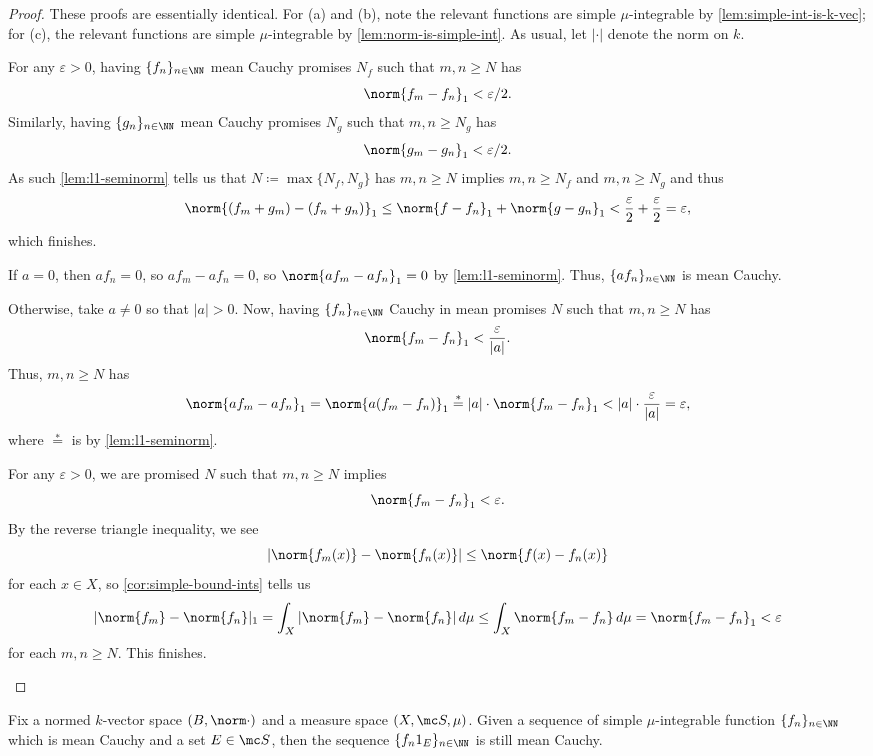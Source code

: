 \documentclass[../notes.tex]{subfiles}
\begin{document}
\begin{proof}
	These proofs are essentially identical. For (a) and (b), note the relevant functions are simple $\mu$-integrable by \autoref{lem:simple-int-is-k-vec}; for (c), the relevant functions are simple $\mu$-integrable by \autoref{lem:norm-is-simple-int}. As usual, let $|\cdot|$ denote the norm on $k$.
	\begin{listalph}
		\item For any $\varepsilon>0$, having $\{f_n\}_{n\in\NN}$ mean Cauchy promises $N_f$ such that $m,n\ge N$ has
		\[\norm{f_m-f_n}_1<\varepsilon/2.\]
		Similarly, having $\{g_n\}_{n\in\NN}$ mean Cauchy promises $N_g$ such that $m,n\ge N_g$ has
		\[\norm{g_m-g_n}_1<\varepsilon/2.\]
		As such \autoref{lem:l1-seminorm} tells us that $N\coloneqq\max\{N_f,N_g\}$ has $m,n\ge N$ implies $m,n\ge N_f$ and $m,n\ge N_g$ and thus
		\[\norm{(f_m+g_m)-(f_n+g_n)}_1\le\norm{f-f_n}_1+\norm{g-g_n}_1<\frac\varepsilon2+\frac\varepsilon2=\varepsilon,\]
		which finishes.
		\item If $a=0$, then $af_n=0$, so $af_m-af_n=0$, so $\norm{af_m-af_n}_1=0$ by \autoref{lem:l1-seminorm}. Thus, $\{af_n\}_{n\in\NN}$ is mean Cauchy.

		Otherwise, take $a\ne0$ so that $|a|>0$. Now, having $\{f_n\}_{n\in\NN}$ Cauchy in mean promises $N$ such that $m,n\ge N$ has
		\[\norm{f_m-f_n}_1<\frac\varepsilon{|a|}.\]
		Thus, $m,n\ge N$ has
		\[\norm{af_m-af_n}_1=\norm{a(f_m-f_n)}_1\stackrel*=|a|\cdot\norm{f_m-f_n}_1<|a|\cdot\frac\varepsilon{|a|}=\varepsilon,\]
		where $\stackrel*=$ is by \autoref{lem:l1-seminorm}.
		\item For any $\varepsilon>0$, we are promised $N$ such that $m,n\ge N$ implies
		\[\norm{f_m-f_n}_1<\varepsilon.\]
		By the reverse triangle inequality, we see
		\[|\norm{f_m(x)}-\norm{f_n(x)}|\le\norm{f(x)-f_n(x)}\]
		for each $x\in X$, so \autoref{cor:simple-bound-ints} tells us
		\[|\norm {f_m}-\norm{f_n}|_1=\int_X|\norm {f_m}-\norm{f_n}|\,d\mu\le\int_X\norm{{f_m}-f_n}\,d\mu=\norm{f_m-f_n}_1<\varepsilon\]
		for each $m,n\ge N$. This finishes.
		\qedhere
	\end{listalph}
\end{proof}
\begin{lemma} \label{lem:restrict-mean-cauchy}
	Fix a normed $k$-vector space $(B,\norm\cdot)$ and a measure space $(X,\mc S,\mu)$. Given a sequence of simple $\mu$-integrable function $\{f_n\}_{n\in\NN}$ which is mean Cauchy and a set $E\in\mc S$, then the sequence $\{f_n1_E\}_{n\in\NN}$ is still mean Cauchy.
\end{lemma}
\end{document}
